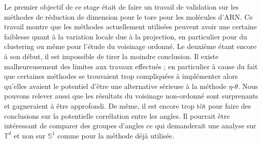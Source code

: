 \documentclass[a4paper,12pt]{article}
\begin{document}
Le premier objectif de ce stage était de faire un travail de validation sur les méthodes de réduction de dimension pour le tore pour les molécules d'ARN. Ce travail montre que les méthodes actuellement utilisées peuvent avoir une certaine faiblesse quant à la variation locale due à la projection, en particulier pour du clustering ou même pour l'étude du voisinage ordonné. Le deuxième étant encore à son début, il est impossible de tirer la moindre conclusion. Il existe malheureusement des limites aux travaux effectués ; en particulier à cause du fait que certaines méthodes se trouvaient trop compliquées à implémenter alors qu'elles avaient le potentiel d'être une alternative sérieuse à la méthode $\eta$-$\theta$. Nous pouvons relever aussi que les résultats du voisinage non-ordonné sont surprenants et gagneraient à être approfondi. De même, il est encore trop tôt pour faire des conclusions sur la potentielle corrélation entre les angles. Il pourrait être intéressant de comparer des groupes d'angles ce qui demanderait une analyse sur $\mathbb{T}^d$ et non sur $\mathbb{S}^1$ comme pour la méthode déjà utilisée.


\newpage


\end{document}

